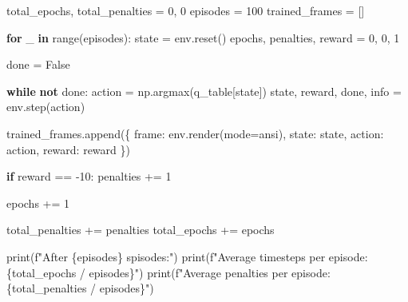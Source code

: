 \documentclass[
  letterpaper,
]{scrbook}
\newenvironment{Shaded}{\begin{snugshade}}{\end{snugshade}}
\newcommand{\BuiltInTok}[1]{\textcolor[rgb]{0.00,0.23,0.31}{#1}}
\newcommand{\ControlFlowTok}[1]{\textcolor[rgb]{0.00,0.23,0.31}{\textbf{#1}}}
\newcommand{\DecValTok}[1]{\textcolor[rgb]{0.68,0.00,0.00}{#1}}
\newcommand{\KeywordTok}[1]{\textcolor[rgb]{0.00,0.23,0.31}{\textbf{#1}}}
\newcommand{\NormalTok}[1]{\textcolor[rgb]{0.00,0.23,0.31}{#1}}
\newcommand{\OperatorTok}[1]{\textcolor[rgb]{0.37,0.37,0.37}{#1}}
\newcommand{\SpecialCharTok}[1]{\textcolor[rgb]{0.37,0.37,0.37}{#1}}
\newcommand{\SpecialStringTok}[1]{\textcolor[rgb]{0.13,0.47,0.30}{#1}}
\newcommand{\StringTok}[1]{\textcolor[rgb]{0.13,0.47,0.30}{#1}}
\newcommand{\VariableTok}[1]{\textcolor[rgb]{0.07,0.07,0.07}{#1}}
\begin{document}
\begin{Shaded}
\begin{Highlighting}[]
\NormalTok{total\_epochs, total\_penalties }\OperatorTok{=} \DecValTok{0}\NormalTok{, }\DecValTok{0}
\NormalTok{episodes }\OperatorTok{=} \DecValTok{100}
\NormalTok{trained\_frames }\OperatorTok{=}\NormalTok{ []}

\ControlFlowTok{for}\NormalTok{ \_ }\KeywordTok{in} \BuiltInTok{range}\NormalTok{(episodes):}
\NormalTok{    state }\OperatorTok{=}\NormalTok{ env.reset()}
\NormalTok{    epochs, penalties, reward }\OperatorTok{=} \DecValTok{0}\NormalTok{, }\DecValTok{0}\NormalTok{, }\DecValTok{1}
    
\NormalTok{    done }\OperatorTok{=} \VariableTok{False}
    
    \ControlFlowTok{while} \KeywordTok{not}\NormalTok{ done: }
\NormalTok{        action }\OperatorTok{=}\NormalTok{ np.argmax(q\_table[state])}
\NormalTok{        state, reward, done, info }\OperatorTok{=}\NormalTok{ env.step(action)}
        
\NormalTok{        trained\_frames.append(\{}
            \StringTok{\textquotesingle{}frame\textquotesingle{}}\NormalTok{: env.render(mode}\OperatorTok{=}\StringTok{\textquotesingle{}ansi\textquotesingle{}}\NormalTok{), }
            \StringTok{\textquotesingle{}state\textquotesingle{}}\NormalTok{: state, }
            \StringTok{\textquotesingle{}action\textquotesingle{}}\NormalTok{: action, }
            \StringTok{\textquotesingle{}reward\textquotesingle{}}\NormalTok{: reward}
\NormalTok{        \})}
        
        \ControlFlowTok{if}\NormalTok{ reward }\OperatorTok{==} \OperatorTok{{-}}\DecValTok{10}\NormalTok{: }
\NormalTok{            penalties }\OperatorTok{+=} \DecValTok{1}
            
\NormalTok{        epochs }\OperatorTok{+=} \DecValTok{1}
        
\NormalTok{    total\_penalties }\OperatorTok{+=}\NormalTok{ penalties}
\NormalTok{    total\_epochs }\OperatorTok{+=}\NormalTok{ epochs}

\BuiltInTok{print}\NormalTok{(}\SpecialStringTok{f"After }\SpecialCharTok{\{}\NormalTok{episodes}\SpecialCharTok{\}}\SpecialStringTok{ spisodes:"}\NormalTok{)}
\BuiltInTok{print}\NormalTok{(}\SpecialStringTok{f"Average timesteps per episode: }\SpecialCharTok{\{}\NormalTok{total\_epochs }\OperatorTok{/}\NormalTok{ episodes}\SpecialCharTok{\}}\SpecialStringTok{"}\NormalTok{)}
\BuiltInTok{print}\NormalTok{(}\SpecialStringTok{f"Average penalties per episode: }\SpecialCharTok{\{}\NormalTok{total\_penalties }\OperatorTok{/}\NormalTok{ episodes}\SpecialCharTok{\}}\SpecialStringTok{"}\NormalTok{)}
\end{Highlighting}
\end{Shaded}
\end{document}
